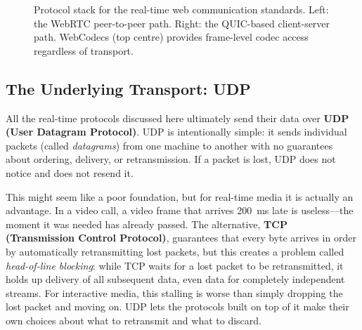 \documentclass[11pt]{article}
\begin{document}
\begin{figure}[ht]
\caption{Protocol stack for the real-time web communication standards.
  Left: the WebRTC peer-to-peer path.  Right: the QUIC-based client-server
  path.  WebCodecs (top centre) provides frame-level codec access regardless
  of transport.}
\label{fig:protocol-stack}
\end{figure}

\subsection{The Underlying Transport: UDP}

All the real-time protocols discussed here ultimately send their data over
\textbf{UDP (User Datagram Protocol)}.  UDP is intentionally simple: it
sends individual packets (called \emph{datagrams}) from one machine to
another with no guarantees about ordering, delivery, or retransmission.  If a
packet is lost, UDP does not notice and does not resend it.

This might seem like a poor foundation, but for real-time media it is
actually an advantage.  In a video call, a video frame that arrives 200~ms
late is useless---the moment it was needed has already passed.  The
alternative, \textbf{TCP (Transmission Control Protocol)}, guarantees that
every byte arrives in order by automatically retransmitting lost packets, but
this creates a problem called \emph{head-of-line blocking}: while TCP waits
for a lost packet to be retransmitted, it holds up delivery of all
subsequent data, even data for completely independent streams.  For
interactive media, this stalling is worse than simply dropping the lost
packet and moving on.  UDP lets the protocols built on top of it make their
own choices about what to retransmit and what to discard.
\end{document}
